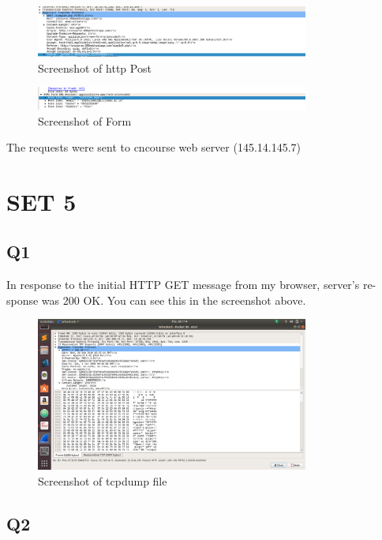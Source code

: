 \documentclass{article}
\begin{document}
  \begin{figure}[H]
 \centering
 \includegraphics[width=0.8\textwidth]{../Set4/c.png}
 \caption{\label{fig:PING}Screenshot of http Post}
 \end{figure}
 
   \begin{figure}[H]
 \centering
 \includegraphics[width=0.8\textwidth]{../Set4/d.png}
 \caption{\label{fig:PING}Screenshot of Form}
 \end{figure}

The requests were sent to cncourse web server (145.14.145.7)\\
\section{SET 5}

\subsection{Q1}
In response to the initial HTTP GET message from my browser, server’s re-
sponse was 200 OK. You can see this in the screenshot above.\\

 \begin{figure}[H]
 \centering
 \includegraphics[width=0.8\textwidth]{../Set5/q1/a.png}
 \caption{\label{fig:PING}Screenshot of tcpdump file}
 \end{figure}
 
\subsection{Q2}
\end{document}
